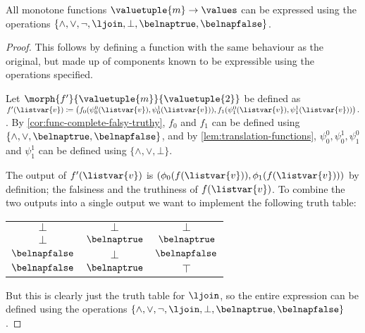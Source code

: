 \begin{theorem}
    \label{thm:belnap-complete}
    All monotone functions \(\valuetuple{m} \to \values\) can be expressed
    using the operations \(
    \{\land,\lor,\neg,\ljoin,\bot,\belnaptrue,\belnapfalse\}
    \).
\end{theorem}
\begin{proof}
    This follows by defining a function with the same behaviour as the original,
    but made up of components known to be expressible using the operations
    specified.

    Let \(\morph{f^\prime}{\valuetuple{m}}{\valuetuple{2}}\) be defined as
    \(
    f^\prime(\listvar{v})
    \coloneqq
    \left(
    f_0(\psi^0_0(\listvar{v}), \psi^1_0(\listvar{v})),
    f_1(\psi^0_1(\listvar{v}), \psi^1_1(\listvar{v}))
    \right).
    \).
    By \cref{cor:func-complete-falsy-truthy}, \(f_0\) and \(f_1\) can be defined
    using \(\{\land,\lor,\belnaptrue,\belnapfalse\}\), and by
    \cref{lem:translation-functions}, \(\psi^0_0,\psi^1_0,\psi^0_1\) and
    \(\psi^1_1\) can be defined using \(\{\land,\lor,\bot\}\).

    The output of \(f^\prime(\listvar{v})\) is \(
    \left(\phi_0(f(\listvar{v})), \phi_1(f(\listvar{v}))\right)
    \) by definition; the falsiness and the truthiness of \(f(\listvar{v})\).
    To combine the two outputs into a single output we want to
    implement the following truth table:

    \begin{center}
        \begin{tabular}{cc|c}
            \(\bot\)         & \(\bot\)        & \(\bot\)         \\
            \(\bot\)         & \(\belnaptrue\) & \(\belnaptrue\)  \\
            \(\belnapfalse\) & \(\bot\)        & \(\belnapfalse\) \\
            \(\belnapfalse\) & \(\belnaptrue\) & \(\top\)
        \end{tabular}
    \end{center}

    But this is clearly just the truth table for \(\ljoin\), so the entire
    expression can be defined using the operations \(
    \{\land,\lor,\neg,\ljoin,\bot,\belnaptrue,\belnapfalse\}
    \).
\end{proof}

